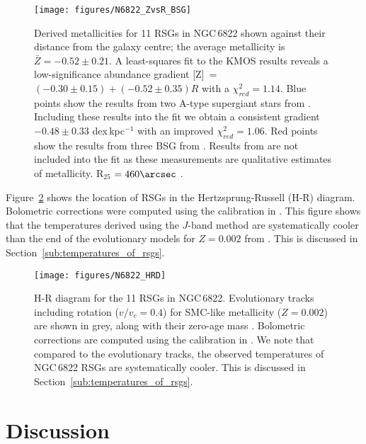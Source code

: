 \documentclass[iop]{emulateapj}
\begin{document}
\begin{figure}
\texttt{[image: figures/N6822\_ZvsR\_BSG]}
\caption{
Derived metallicities for 11 RSGs in NGC\,6822 shown against their distance from the galaxy centre;
the average metallicity is
$\bar{Z} = -0.52\pm 0.21$.
A least-squares fit to the KMOS results reveals a low-significance abundance gradient
[Z]~=~$(-0.30\pm0.15)+(-0.52\pm0.35)R$ with a $\chi^{2}_{red}=1.14$.
Blue points show the results from two A-type supergiant stars from
\protect\cite{2001ApJ...547..765V}.
Including these results into the fit we obtain a consistent gradient
$-0.48\pm0.33$ dex\,kpc$^{-1}$ with an improved $\chi^{2}_{red}=1.06$.
Red points show the results from three BSG from
\protect\cite{1999A&A...352L..40M}.
Results from 
\protect\cite{1999A&A...352L..40M} are not included into the fit as these measurements are qualitative estimates of metallicity.
R$_{25}$ $= 460 \arcsec$
\citep[$=1.12$\,kpc;][]{2012AJ....144....4M}.
        }
\label{fig:ZvsR}
\end{figure}

Figure~\ref{fig:6822HRD} shows the location of RSGs in the Hertzsprung-Russell (H-R) diagram.
Bolometric corrections were computed using the calibration in
\cite{2013ApJ...767....3D}.
This figure shows that the temperatures derived using the $J$-band method are systematically cooler than the end of the evolutionary models for
$Z=0.002$ from
\cite{2013A&A...558A.103G}.
This is discussed in Section~\ref{sub:temperatures_of_rsgs}.


\begin{figure}
\texttt{[image: figures/N6822\_HRD]}
\caption{
H-R diagram for the 11 RSGs in NGC\,6822.
Evolutionary tracks including rotation
($v/v_{c} = 0.4$) for SMC-like metallicity ($Z=0.002$)
are shown in grey, along with their zero-age mass
\protect\citep{2013A&A...558A.103G}.
Bolometric corrections are computed using the calibration in
\protect\cite{2013ApJ...767....3D}.
We note that compared to the evolutionary tracks,
the observed temperatures of NGC\,6822 RSGs are systematically cooler.
This is discussed in Section~\ref{sub:temperatures_of_rsgs}.
}
\label{fig:6822HRD}
\end{figure}



\section{Discussion} %
\label{sec:discussion}
\end{document}
